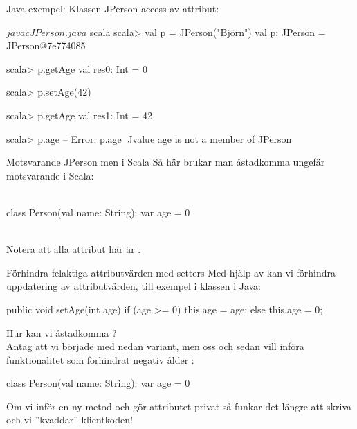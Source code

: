 \begin{Slide}{Java-exempel: Klassen JPerson}\SlideFontSmall
{} access av  attribut:
\vspace{-1em}\begin{multicols}{2}

\columnbreak

\begin{REPLnonum}[basicstyle=\SlideFontSize{7}{9}\ttfamily\color{white}]
$ javac JPerson.java
$ scala
scala> val p = JPerson("Björn")
val p: JPerson = JPerson@7e774085

scala> p.getAge
val res0: Int = 0

scala> p.setAge(42)

scala> p.getAge
val res1: Int = 42

scala> p.age
-- Error:
p.age
^^^^^
value age is not a member of JPerson
\end{REPLnonum}
\end{multicols}
\end{Slide}


\begin{Slide}{Motsvarande JPerson men i Scala}
Så här brukar man åstadkomma ungefär motsvarande i Scala: \\~
\begin{Code}[basicstyle=\SlideFontSize{12}{15}\ttfamily\selectfont]
class Person(val name: String):
  var age = 0
\end{Code}
~\\
Notera att alla attribut här är .
\end{Slide}


\begin{Slide}{Förhindra felaktiga attributvärden med setters}\SlideFontSmall
Med hjälp av \Emph{setters} kan vi förhindra \Alert{felaktig} uppdatering av attributvärden, till exempel  i klassen  i Java:
\begin{Code}[language=Java]
    public void setAge(int age){
        if (age >= 0) {
            this.age = age;
        } else {
            this.age = 0;
        }
    }
\end{Code}
Hur kan vi åstadkomma ? \\
\pause
Antag att vi började med nedan variant, men  oss och sedan vill införa funktionalitet som förhindrat negativ ålder :
\begin{Code}
class Person(val name: String):
  var age = 0
\end{Code}
Om vi inför en ny metod  och gör attributet  privat så funkar det  längre att skriva   och vi ''kvaddar'' klientkoden! \code{  :(}
\end{Slide}



